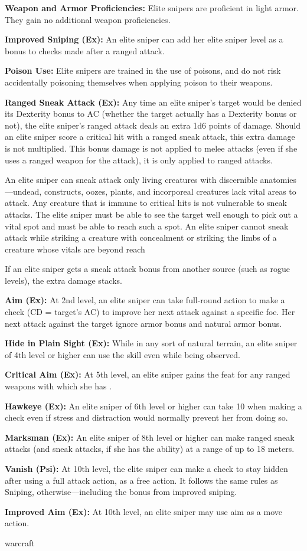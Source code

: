 {
\textbf{Weapon and Armor Proficiencies:} Elite snipers are proficient in light armor. They gain no additional weapon proficiencies.

\textbf{Improved Sniping (Ex):} An elite sniper can add her elite sniper level as a bonus to  checks made after a ranged attack.

\textbf{Poison Use:} Elite snipers are trained in the use of poisons, and do not risk accidentally poisoning themselves when applying poison to their weapons.

\textbf{Ranged Sneak Attack (Ex):} Any time an elite sniper's target would be denied its Dexterity bonus to AC (whether the target actually has a Dexterity bonus or not), the elite sniper's ranged attack deals an extra 1d6 points of damage.  Should an elite sniper score a critical hit with a ranged sneak attack, this extra damage is not multiplied. This bonus damage is not applied to melee attacks (even if she uses a ranged weapon for the attack), it is only applied to ranged attacks.

An elite sniper can sneak attack only living creatures with discernible anatomies---undead, constructs, oozes, plants, and incorporeal creatures lack vital areas to attack. Any creature that is immune to critical hits is not vulnerable to sneak attacks. The elite sniper must be able to see the target well enough to pick out a vital spot and must be able to reach such a spot. An elite sniper cannot sneak attack while striking a creature with concealment or striking the limbs of a creature whose vitals are beyond reach\

If an elite sniper gets a sneak attack bonus from another source (such as rogue levels), the extra damage stacks.

\textbf{Aim (Ex):} At 2nd level, an elite sniper can take full-round action to make a  check (CD = target's AC) to improve her next attack against a specific foe. Her next attack against the target ignore armor bonus and natural armor bonus.

\textbf{Hide in Plain Sight (Ex):} While in any sort of natural terrain, an elite sniper of 4th level or higher can use the  skill even while being observed.

\textbf{Critical Aim (Ex):} At 5th level, an elite sniper gains the  feat for any ranged weapons with which she has .

\textbf{Hawkeye (Ex):} An elite sniper of 6th level or higher can take 10 when making a  check even if stress and distraction would normally prevent her from doing so.

\textbf{Marksman (Ex):} An elite sniper of 8th level or higher can make ranged sneak attacks (and sneak attacks, if she has the ability) at a range of up to 18 meters.

\textbf{Vanish (Psi):} At 10th level, the elite sniper can make a  check to stay hidden after using a full attack action, as a free action. It follows the same rules as Sniping, otherwise---including the bonus from improved sniping.

\textbf{Improved Aim (Ex):} At 10th level, an elite sniper may use aim as a move action.
}
{}
{warcraft}
{}
{}
{}
